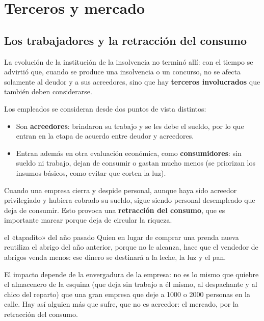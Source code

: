 \documentclass[12pt,oneside]{book}
\begin{document}
\chapter[Terceros y mercado]{Terceros y mercado}

\section{Los trabajadores y la retracción del consumo}

La evolución de la institución de la insolvencia no terminó allí: con el tiempo se advirtió que, cuando se produce una insolvencia o un concurso, no se afecta solamente al deudor y a sus acreedores, sino que hay \textbf{terceros involucrados} que también deben considerarse.

Los empleados se consideran desde dos puntos de vista distintos:

\begin{itemize}
    \item Son \textbf{acreedores}: brindaron su trabajo y se les debe el sueldo, por lo que entran en la etapa de acuerdo entre deudor y acreedores.
    \item Entran además en otra evaluación económica, como \textbf{consumidores}: sin sueldo ni trabajo, dejan de consumir o gastan mucho menos (se priorizan los insumos básicos, como evitar que corten la luz).
\end{itemize}

Cuando una empresa cierra y despide personal, aunque haya sido acreedor privilegiado y hubiera cobrado su sueldo, sigue siendo personal desempleado que deja de consumir. Esto provoca una \textbf{retracción del consumo}, que es importante marcar porque deja de circular la riqueza.

\begin{example}{el «tapadito» del año pasado}
Quien en lugar de comprar una prenda nueva reutiliza el abrigo del año anterior, porque no le alcanza, hace que el vendedor de abrigos venda menos: ese dinero se destinará a la leche, la luz y el pan.
\end{example}

El impacto depende de la envergadura de la empresa: no es lo mismo que quiebre el almacenero de la esquina (que deja sin trabajo a él mismo, al despachante y al chico del reparto) que una gran empresa que deje a 1000 o 2000 personas en la calle. Hay así alguien más que sufre, que no es acreedor: el mercado, por la retracción del consumo.
\end{document}
